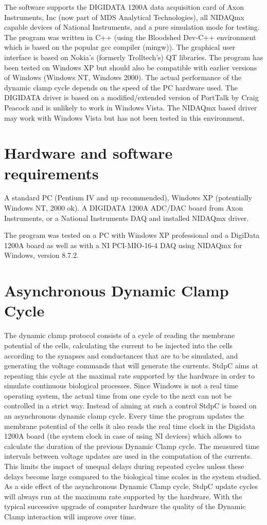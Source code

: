 \documentclass{article}
\begin{document}
The software supports the DIGIDATA 1200A data acquisition card of Axon
Instruments, Inc (now part of MDS Analytical Technologies), all
NIDAQmx capable devices of National Instruments, and a pure simulation
mode for testing. The program was written in C++ (using the Bloodshed
Dev-C++ environment which is based on the popular gcc compiler
(mingw)). The graphical user interface is based on Nokia's (formerly Trolltech's) QT
libraries. The program has been tested on Windows XP but should also
be compatible with earlier versions of Windows (Windows NT, Windows
2000). The actual performance of the dynamic clamp cycle depends
on the speed of the PC hardware used. The DIGIDATA driver is
based on a modified/extended version of PortTalk by Craig Peacock and
is unlikely to work in Windows Vista. The NIDAQmx based driver may
work with Windows Vista but has not been tested in this environment.

\section{Hardware and software requirements} 
 
A standard PC (Pentium IV and up recommended), Windows XP (potentially
Windows NT, 2000 ok). A DIGIDATA 1200A ADC/DAC board from Axon
Instruments, or a National Instruments DAQ and installed NIDAQmx
driver.

The program was tested on a PC with Windows XP professional and a
DigiData 1200A board as well as with a NI PCI-MIO-16-4 DAQ using NIDAQmx for
Windows, version 8.7.2.

\section{Asynchronous Dynamic Clamp Cycle}
 
The dynamic clamp protocol consists of a cycle of reading the membrane
potential of the cells, calculating the current to be injected into
the cells according to the synapses and conductances that are to be
simulated, and generating the voltage commands that will generate the
currents. StdpC aims at repeating this cycle at the maximal rate
supported by the hardware in order to simulate continuous biological
processes. Since Windows is not a real time operating system, the
actual time from one cycle to the next can not be controlled in a
strict way. Instead of aiming at such a control StdpC is based on an
asynchronous dynamic clamp cycle.  Every time the program updates the
membrane potential of the cells it also reads the real time clock in
the Digidata 1200A board (the system clock in case of using NI
devices) which allows to calculate the duration of the previous
Dynamic Clamp cycle. The measured time intervals between voltage
updates are used in the computation of the currents. This limits the
impact of unequal delays during repeated cycles unless these delays
become large compared to the biological time scales in the system
studied. As a side effect of the asynchronous Dynamic Clamp cycle,
StdpC update cycles will always run at the maximum rate supported by
the hardware. With the typical successive upgrade of computer hardware
the quality of the Dynamic Clamp interaction will improve over time.
\end{document}
